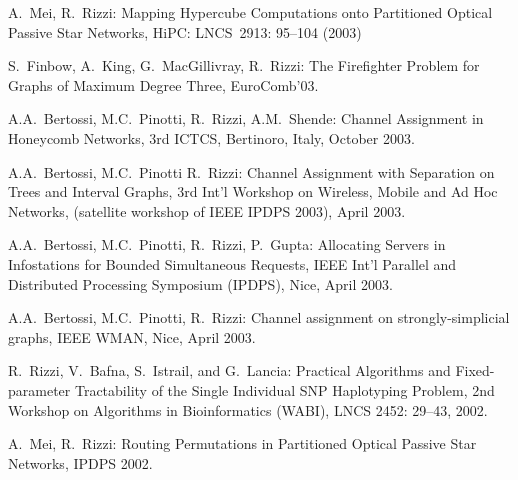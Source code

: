 \begin{etaremune}
\vspace{-1.8mm}
  \item {A.~Mei, R.~Rizzi:}
   \newblock Mapping Hypercube Computations onto Partitioned Optical Passive Star Networks,
   \newblock HiPC:
   \newblock  LNCS~2913: 95--104 (2003)

\vspace{-1.8mm}
  \item {S.~Finbow, A.~King, G.~MacGillivray, R.~Rizzi:}
   \newblock The Firefighter Problem for Graphs of Maximum Degree Three,
   \newblock EuroComb'03.

\vspace{-1.8mm}
  \item {A.A.~Bertossi, M.C.~Pinotti, R.~Rizzi, A.M.~Shende:}
   \newblock Channel Assignment in Honeycomb Networks,
   \newblock 3rd ICTCS,
   \newblock Bertinoro, Italy, October 2003.

\vspace{-1.8mm}
  \item {A.A.~Bertossi, M.C.~Pinotti R.~Rizzi:}
   \newblock Channel Assignment with Separation on Trees and Interval Graphs,
   \newblock 3rd Int’l Workshop on Wireless, Mobile and Ad Hoc Networks,
   \newblock (satellite workshop of IEEE IPDPS 2003),
   \newblock April 2003.

\vspace{-1.8mm}
  \item {A.A.~Bertossi, M.C.~Pinotti, R.~Rizzi, P.~Gupta:}
   \newblock Allocating Servers in Infostations for Bounded Simultaneous Requests,
   \newblock IEEE Int’l Parallel and Distributed Processing Symposium (IPDPS),
   \newblock Nice, April 2003.

\vspace{-1.8mm}
  \item {A.A.~Bertossi, M.C.~Pinotti, R.~Rizzi:}
   \newblock Channel assignment on strongly-simplicial graphs,
   \newblock IEEE WMAN,
   \newblock Nice, April 2003.

\vspace{-1.8mm}
  \item {R.~Rizzi, V.~Bafna, S.~Istrail, and G.~Lancia:}
   \newblock Practical Algorithms and Fixed-parameter Tractability
   \newblock of the Single Individual SNP Haplotyping Problem,
   \newblock 2nd Workshop on Algorithms in Bioinformatics (WABI),
   \newblock LNCS 2452: 29--43, 2002.

\vspace{-1.8mm}
  \item {A.~Mei, R.~Rizzi:}
   \newblock Routing Permutations in Partitioned Optical Passive Star Networks,
   \newblock IPDPS 2002.


\end{etaremune}
